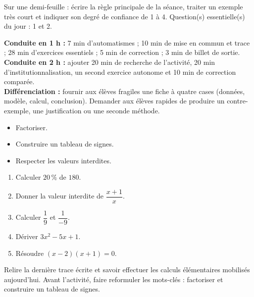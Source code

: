 \begin{sortie}Sur une demi-feuille : écrire la règle principale de la séance, traiter un exemple très court et indiquer son degré de confiance de 1 à 4. Question(s) essentielle(s) du jour : 1 et 2.\end{sortie}

\ifprof
\begin{methode}
\textbf{Conduite en 1 h :} 7 min d'automatismes ; 10 min de mise en commun et trace ; 28 min d'exercices essentiels ; 5 min de correction ; 3 min de billet de sortie.\\
\textbf{Conduite en 2 h :} ajouter 20 min de recherche de l'activité, 20 min d'institutionnalisation, un second exercice autonome et 10 min de correction comparée.\\
\textbf{Différenciation :} fournir aux élèves fragiles une fiche à quatre cases (données, modèle, calcul, conclusion). Demander aux élèves rapides de produire un contre-exemple, une justification ou une seconde méthode.
\end{methode}
\fi
{}
\begin{objectifs}\begin{itemize}\item Factoriser.\item Construire un tableau de signes.\item Respecter les valeurs interdites.\end{itemize}\end{objectifs}
\begin{automatismes}\begin{enumerate}\item Calculer $20\,\%$ de $180$. \item Donner la valeur interdite de $\dfrac{x+1}{x}$. \item Calculer $\dfrac1{9}$ et $\dfrac1{-9}$. \item Dériver $3x^2-5x+1$. \item Résoudre $(x-2)(x+1)=0$. \end{enumerate}\end{automatismes}
\begin{prerequis}Relire la dernière trace écrite et savoir effectuer les calculs élémentaires mobilisés aujourd'hui. Avant l'activité, faire reformuler les mots-clés : factoriser et construire un tableau de signes.\end{prerequis}

